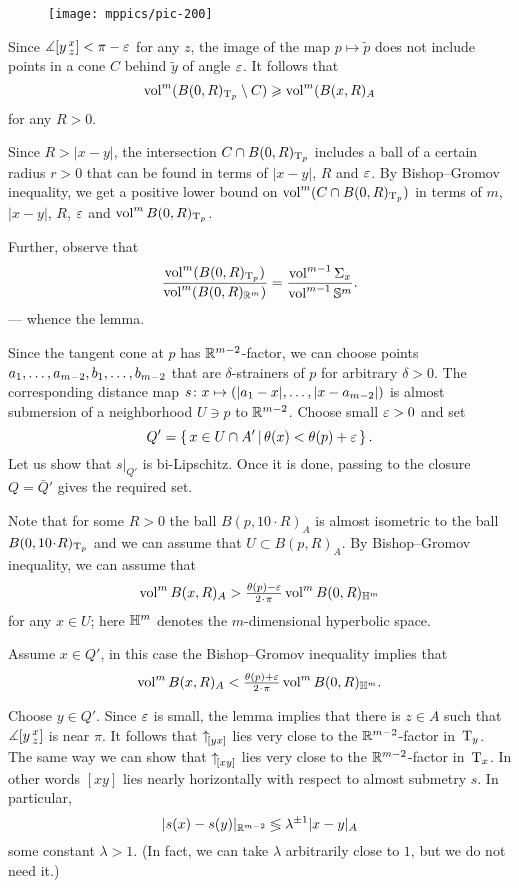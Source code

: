 \begin{wrapfigure}{r}{35 mm}
\vskip-0mm
\centering
\texttt{[image: mppics/pic-200]}
\vskip0mm
\end{wrapfigure}

Since $\measuredangle[y\,{}^{x}_{z}]<\pi-\varepsilon$ for any $z$, the image of the map $p\mapsto \tilde p$ does not include points in a cone $C$ behind $\tilde y$ of angle $\varepsilon$.
It follows that 
\[\operatorname{vol}^m(B(0,R)_{\mathrm{T}_p}\setminus C)\geqslant \operatorname{vol}^m(B(x,R)_A\]
for any $R>0$.

Since $R>|x-y|$, the intersection $C\zz\cap B(0,R)_{\T_p}$ includes a ball of a certain radius $r>0$ that can be found in terms of $|x-y|$, $R$ and $\varepsilon$.
By Bishop--Gromov inequality, we get a positive lower bound on $\operatorname{vol}^m(C\cap B(0,R)_{\mathrm{T}_p})$ in terms of $m$, $|x-y|$, $R$, $\varepsilon$ and $\operatorname{vol}^mB(0,R)_{\mathrm{T}_p}$.

Further, observe that 
\[\frac{\operatorname{vol}^m(B(0,R)_{\mathrm{T}_p})}{\operatorname{vol}^m(B(0,R)_{\mathbb{R}^m})}
=
\frac{\operatorname{vol}^{m-1} \Sigma_x}{\operatorname{vol}^{m-1} \mathbb{S}^m}.
\]
--- whence the lemma.
\qeds







Since the tangent cone at $p$ has $\mathbb{R}^{m-2}$-factor, 
we can choose points $a_1,\zz\dots,a_{m-2},b_1,\zz\dots,b_{m-2}$ that are $\delta$-strainers of $p$ for arbitrary $\delta>0$.
The corresponding distance map $s\:x\zz\mapsto (|a_1-x|,\zz\dots,|x-a_{m-2}|)$ is almost submersion of a neighborhood $U\ni p$ to $\mathbb{R}^{m-2}$.
Choose small $\varepsilon>0$ and set 
\[Q'=\left\{\,x\in U\cap A'\,\middle|\,\theta(x)<\theta(p)+\varepsilon\,\right\}.\]
Let us show that $s|_{Q'}$ is bi-Lipschitz.
Once it is done, passing to the closure $Q=\bar Q'$ gives the required set. 

Note that for some $R>0$ the ball $B(p,10\cdot R)_A$ is almost isometric to the ball $B(0,10\cdot R)_{\T_p}$
and we can assume that $U\subset B(p,R)_A$.
By Bishop--Gromov inequality, we can assume that 
\[\vol^m B(x,R)_A>\tfrac{\theta(p)-\eps}{2\cdot \pi}\vol^m B(0,R)_{\HH^m}\]
for any $x\in U$; here $\mathbb{H}^m$ denotes the $m$-dimensional hyperbolic space. 

Assume $x\in Q'$, in this case the Bishop--Gromov inequality implies that 
\[\vol^m B(x,R)_A< \tfrac{\theta(p)+\eps}{2\cdot \pi}\vol^m B(0,R)_{\HH^m}.\]

Choose $y\in Q'$.
Since $\varepsilon$ is small, the lemma implies that there is $z\in A$ such that $\measuredangle[y\,{}^{x}_{z}]$ is near $\pi$.
It follows that ${\uparrow}_{\hskip-0.15em[{y}{x}]}$ lies very close to the $\mathbb{R}^{m-2}$-factor in~$\mathrm{T}_y$.
The same way we can show that ${\uparrow}_{\hskip-0.15em[{x}{y}]}$ lies very close to the $\mathbb{R}^{m-2}$-factor in~$\mathrm{T}_x$.
In other words $[xy]$ lies nearly horizontally with respect to almost submetry $s$.
In particular,  
\[|s(x)-s(y)|_{\mathbb{R}^{m-2}} \lessgtr \lambda^{\pm1}|x-y|_{A}\]
some constant $\lambda>1$.
(In fact, we can take $\lambda$ arbitrarily close to $1$, but we do not need it.)
\qeds
